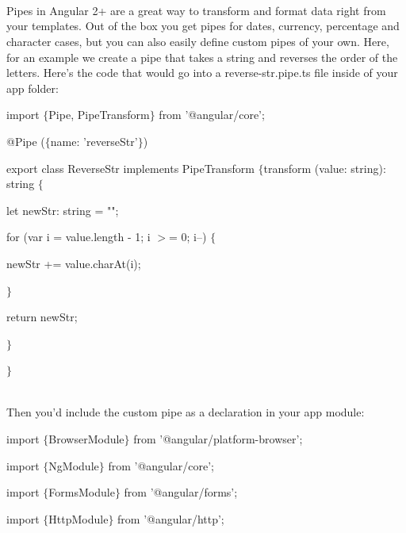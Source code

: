 \documentclass{article}
\begin{document}
\noindent 

\noindent 

\noindent 

\noindent 
\\ \\ 

\noindent \textbf{}

\noindent \\ Pipes in Angular 2+ are a great way to transform and format data right from your templates. Out of the box you get pipes for dates, currency, percentage and character cases, but you can also easily define custom pipes of your own. Here, for an example we create a pipe that takes a string and reverses the order of the letters. Here's the code that would go into a reverse-str.pipe.ts file inside of your app folder: \\

\noindent 

\noindent import $\mathrm{\{}$Pipe, PipeTransform$\mathrm{\}}$ from '@angular/core';

\noindent 

\noindent @Pipe ($\mathrm{\{}$name: 'reverseStr'$\mathrm{\}}$)

\noindent export class ReverseStr implements PipeTransform $\mathrm{\{}$transform (value: string): string $\mathrm{\{}$

let newStr: string = "";

for (var i = value.length - 1; i $\mathrm{>}$= 0; i--) $\mathrm{\{}$ 

newStr += value.charAt(i);

$\mathrm{\}}$

return newStr;

$\mathrm{\}}$

\noindent $\mathrm{\}}$

\noindent 

\noindent \\ Then you'd include the custom pipe as a declaration in your app module: 

\noindent import $\mathrm{\{}$BrowserModule$\mathrm{\}}$ from '@angular/platform-browser';

\noindent import $\mathrm{\{}$NgModule$\mathrm{\}}$ from '@angular/core'; 

\noindent import $\mathrm{\{}$FormsModule$\mathrm{\}}$ from '@angular/forms'; 

\noindent import $\mathrm{\{}$HttpModule$\mathrm{\}}$ from '@angular/http';
\end{document}
